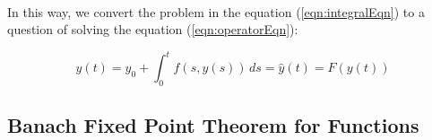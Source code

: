 \documentclass{article}
\theoremstyle{definition}
\theoremstyle{remark}
\begin{document}
\paragraph{  }

In this way, we convert the problem in the equation (\ref{eqn:integralEqn}) to a question of solving the equation (\ref{eqn:operatorEqn}):

\begin{equation}\label{eqn:operatorEqn}
    y(t) = y_0 + \int_{0}^{t}{f(s,y(s))}\,ds = \hat{y}(t) = F(y(t))
\end{equation}

\subsection{Banach Fixed Point Theorem for Functions}
\end{document}

